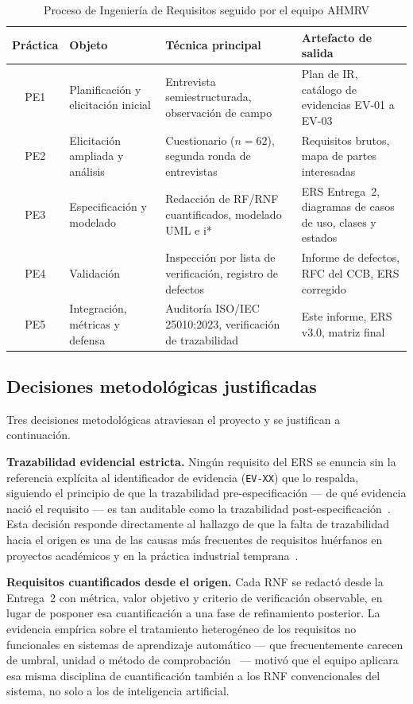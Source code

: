 \documentclass[11pt,a4paper]{article}
\newcommand{\id}[1]{\texttt{#1}}
\begin{document}
\begin{table}[!htbp]
\centering
\caption{Proceso de Ingeniería de Requisitos seguido por el equipo AHMRV}
\label{tab:proceso}
\begin{tabular}{|c|L{3.4cm}|L{4.4cm}|L{4.6cm}|}
\hline
{}\textbf{Práctica} & \textbf{Objeto} & \textbf{Técnica principal} & \textbf{Artefacto de salida} \\
\hline
PE1 & Planificación y elicitación inicial & Entrevista semiestructurada, observación de campo & Plan de IR, catálogo de evidencias EV-01 a EV-03 \\ \hline
PE2 & Elicitación ampliada y análisis & Cuestionario ($n=62$), segunda ronda de entrevistas & Requisitos brutos, mapa de partes interesadas \\ \hline
PE3 & Especificación y modelado & Redacción de RF/RNF cuantificados, modelado UML e i* & ERS Entrega~2, diagramas de casos de uso, clases y estados \\ \hline
PE4 & Validación & Inspección por lista de verificación, registro de defectos & Informe de defectos, RFC del CCB, ERS corregido \\ \hline
PE5 & Integración, métricas y defensa & Auditoría ISO/IEC 25010:2023, verificación de trazabilidad & Este informe, ERS v3.0, matriz final \\ \hline
\end{tabular}
\end{table}

\subsection{Decisiones metodológicas justificadas}

Tres decisiones metodológicas atraviesan el proyecto y se justifican a continuación.

\textbf{Trazabilidad evidencial estricta.} Ningún requisito del ERS se enuncia sin la referencia
explícita al identificador de evidencia (\id{EV-XX}) que lo respalda, siguiendo el principio de que
la trazabilidad pre-especificación --- de qué evidencia nació el requisito --- es tan auditable
como la trazabilidad post-especificación~\cite{mucha2024}. Esta decisión responde directamente al
hallazgo de que la falta de trazabilidad hacia el origen es una de las causas más frecuentes de
requisitos huérfanos en proyectos académicos y en la práctica industrial temprana~\cite{mucha2024}.

\textbf{Requisitos cuantificados desde el origen.} Cada RNF se redactó desde la Entrega~2 con
métrica, valor objetivo y criterio de verificación observable, en lugar de posponer esa
cuantificación a una fase de refinamiento posterior. La evidencia empírica sobre el tratamiento
heterogéneo de los requisitos no funcionales en sistemas de aprendizaje automático --- que
frecuentemente carecen de umbral, unidad o método de comprobación~\cite{habibullah2023} --- motivó
que el equipo aplicara esa misma disciplina de cuantificación también a los RNF convencionales del
sistema, no solo a los de inteligencia artificial.
\end{document}
